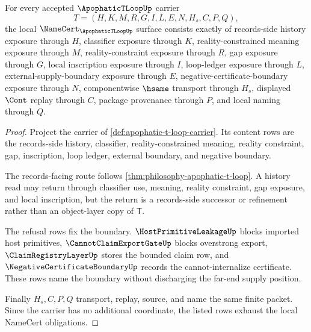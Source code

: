\begin{theorem}
\label{thm:apophatic-t-loop-namecert-obligations}
For every accepted $\ApophaticTLoopUp$ carrier
$$
T=(H,K,M,R,G,I,L,E,N,H_s,C,P,Q),
$$
the local $\NameCert_{\ApophaticTLoopUp}$ surface consists exactly of records-side history exposure through $H$, classifier exposure through $K$, reality-constrained meaning exposure through $M$, reality-constraint exposure through $R$, gap exposure through $G$, local inscription exposure through $I$, loop-ledger exposure through $L$, external-supply-boundary exposure through $E$, negative-certificate-boundary exposure through $N$, componentwise $\hsame$ transport through $H_s$, displayed $\Cont$ replay through $C$, package provenance through $P$, and local naming through $Q$.
\end{theorem}
\begin{proof}
Project the carrier of \autoref{def:apophatic-t-loop-carrier}. Its content rows are the records-side history, classifier, reality-constrained meaning, reality constraint, gap, inscription, loop ledger, external boundary, and negative boundary.

The records-facing route follows \autoref{thm:philosophy-apophatic-t-loop}. A history read may return through classifier use, meaning, reality constraint, gap exposure, and local inscription, but the return is a records-side successor or refinement rather than an object-layer copy of $\mathsf{T}$.

The refusal rows fix the boundary. $\HostPrimitiveLeakageUp$ blocks imported host primitives, $\CannotClaimExportGateUp$ blocks overstrong export, $\ClaimRegistryLayerUp$ stores the bounded claim row, and $\NegativeCertificateBoundaryUp$ records the cannot-internalize certificate. These rows name the boundary without discharging the far-end supply position.

Finally $H_s,C,P,Q$ transport, replay, source, and name the same finite packet. Since the carrier has no additional coordinate, the listed rows exhaust the local NameCert obligations.
\end{proof}

